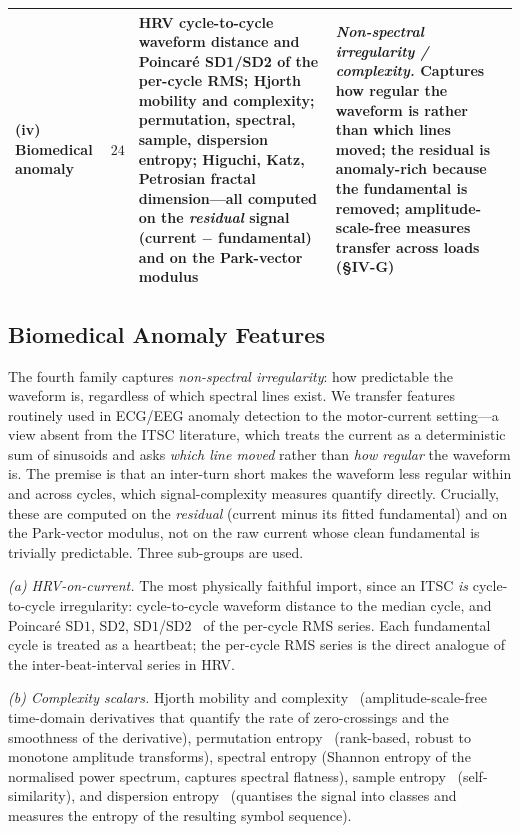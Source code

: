\documentclass[journal]{IEEEtran}
\begin{document}
\begin{table}[!t]
\begin{tabular}{@{}p{} c p{} p{} c@{}}
\midrule
\textbf{(iv) Biomedical anomaly}
& $24$
& HRV cycle-to-cycle waveform distance and Poincar\'{e} SD1/SD2 of the per-cycle RMS;
  Hjorth mobility and complexity; permutation, spectral, sample, dispersion entropy;
  Higuchi, Katz, Petrosian fractal dimension---all computed on the \emph{residual} signal
  (current $-$ fundamental) and on the Park-vector modulus
& \emph{Non-spectral irregularity / complexity.} Captures how regular the waveform is
  rather than which lines moved; the residual is anomaly-rich because the fundamental is
  removed; amplitude-scale-free measures transfer across loads (\S IV-G)
& \cite{hrv1996,brennan2001,hjorth1970,bandt2002,richman2000,rostaghi2016,higuchi1988} \\
\bottomrule
\end{tabular}
\end{table}

\subsection{Biomedical Anomaly Features}
\label{sec:features-bio}
The fourth family captures \emph{non-spectral irregularity}: how predictable the waveform
is, regardless of which spectral lines exist. We transfer features routinely used in
ECG/EEG anomaly detection to the motor-current setting---a view absent from the ITSC
literature, which treats the current as a deterministic sum of sinusoids and asks
\emph{which line moved} rather than \emph{how regular} the waveform is. The premise is
that an inter-turn short makes the waveform less regular within and across cycles, which
signal-complexity measures quantify directly. Crucially, these are computed on the
\emph{residual} (current minus its fitted fundamental) and on the Park-vector modulus,
not on the raw current whose clean fundamental is trivially predictable. Three
sub-groups are used.

\emph{(a) HRV-on-current.} The most physically faithful import, since an ITSC \emph{is}
cycle-to-cycle irregularity: cycle-to-cycle waveform distance to the median cycle, and
Poincar\'e SD$1$, SD$2$, SD$1$/SD$2$~\cite{hrv1996,brennan2001} of the per-cycle RMS
series. Each fundamental cycle is treated as a heartbeat; the per-cycle RMS series is the
direct analogue of the inter-beat-interval series in HRV.

\emph{(b) Complexity scalars.} Hjorth mobility and complexity~\cite{hjorth1970}
(amplitude-scale-free time-domain derivatives that quantify the rate of zero-crossings
and the smoothness of the derivative), permutation entropy~\cite{bandt2002} (rank-based,
robust to monotone amplitude transforms), spectral entropy (Shannon entropy of the
normalised power spectrum, captures spectral flatness), sample entropy~\cite{richman2000}
(self-similarity), and dispersion entropy~\cite{rostaghi2016} (quantises the signal into
classes and measures the entropy of the resulting symbol sequence).
\end{document}
